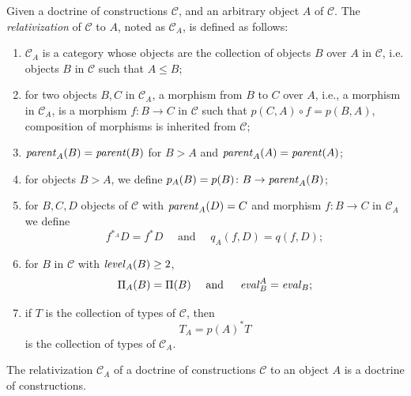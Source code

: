 \begin{definition}
    Given a doctrine of constructions $\mathcal{C}$, and an arbitrary object $A$ of $\mathcal{C}$. The \textit{relativization}
    of $\mathcal{C}$ to $A$, noted as $\mathcal{C}_A$, is defined as follows:
    \begin{enumerate}
        \item $\mathcal{C}_A$ is a category whose objects are the collection of objects $B$ over $A$ in $\mathcal{C}$,
              i.e. objects $B$ in $\mathcal{C}$ such that $A \leq B$;
        \item for two objects $B, C$ in $\mathcal{C}_A$, a morphism from $B$ to $C$ over $A$, i.e., a morphism in $\mathcal{C}_A$,
              is a morphism $f \colon B \to C$ in $\mathcal{C}$ such that $p(C, A) \circ f = p(B, A)$, composition
              of morphisms is inherited from $\mathcal{C}$;
        \item $\operatorname{\mathit{parent}}_A(B) = \operatorname{\mathit{parent}}(B)$ for $B > A$ and $\operatorname{\mathit{parent}}_A(A) = \operatorname{\mathit{parent}}(A)$;
        \item for objects $B > A$, we define $p_A(B) = p(B) \colon B \to \operatorname{\mathit{parent}}_A(B)$;
        \item for $B, C, D$ objects of $\mathcal{C}$ with $\operatorname{\mathit{parent}}_A(D) = C$ and morphism $f \colon B \to C$ in $\mathcal{C}_A$
              we define \[
                f^{*_A}D = f^*D \quad \text{ and } \quad q_A(f, D) = q(f, D);
              \]
        \item for $B$ in $\mathcal{C}$ with $\operatorname{\mathit{level}}_A(B) \geq 2$,
              \[
                \Pi_A(B) = \Pi(B) \quad \text{ and } \quad \operatorname{\mathit{eval}}^A_B = \operatorname{\mathit{eval}}_B;
              \]
        \item if $T$ is the collection of types of $\mathcal{C}$, then 
              \[
                T_A = p(A)^*T
              \]
              is the collection of types of $\mathcal{C}_A$.
    \end{enumerate}
\end{definition}
\begin{theorem}
    The relativization $\mathcal{C}_A$ of a doctrine of constructions $\mathcal{C}$ to an object $A$ is a doctrine of constructions.
\end{theorem}
